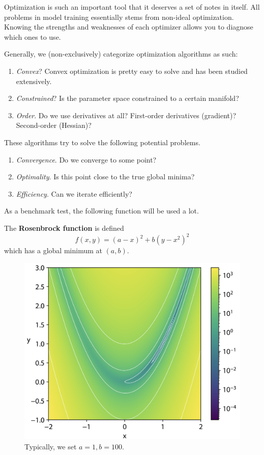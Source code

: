 Optimization is such an important tool that it deserves a set of notes in itself. All problems in model training essentially stems from non-ideal optimization. Knowing the strengths and weaknesses of each optimizer allows you to diagnose which ones to use. 

Generally, we (non-exclusively) categorize optimization algorithms as such: 
\begin{enumerate}
  \item \textit{Convex}? Convex optimization is pretty easy to solve and has been studied extensively. 
  \item \textit{Constrained}? Is the parameter space constrained to a certain manifold? 
  \item \textit{Order}. Do we use derivatives at all? First-order derivatives (gradient)? Second-order (Hessian)? 
\end{enumerate}

These algorithms try to solve the following potential problems. 
\begin{enumerate}
  \item \textit{Convergence}. Do we converge to some point? 
  \item \textit{Optimality}. Is this point close to the true global minima?  
  \item \textit{Efficiency}. Can we iterate efficiently? 
\end{enumerate} 

As a benchmark test, the following function will be used a lot. 

\begin{definition}
  The \textbf{Rosenbrock function} is defined 
  \begin{equation}
    f(x, y) = (a - x)^2 + b (y - x^2)^2
  \end{equation}
  which has a global minimum at $(a, b)$. 

  \begin{figure}[H]
    \centering 
    \includegraphics[scale=0.4]{img/rosenbrock.png}
    \caption{Typically, we set $a = 1, b = 100$. } 
    \label{fig:rosenbrock}
  \end{figure}
\end{definition}


